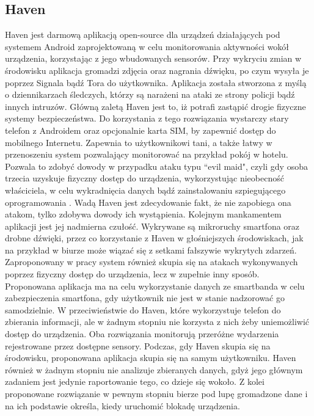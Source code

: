 \subsection{Haven}
Haven jest darmową aplikacją open-source dla urządzeń działających pod systemem Android zaprojektowaną w celu monitorowania aktywności wokół urządzenia,
korzystając z jego wbudowanych sensorów. Przy wykryciu zmian w środowisku aplikacja gromadzi zdjęcia oraz nagrania dźwięku, po czym wysyła je poprzez
Signala bądź Tora do użytkownika. Aplikacja została stworzona z myślą o dziennikarzach śledczych, którzy są narażeni na ataki ze strony policji bądź innych
intruzów\cite{Haven}.
\newline\newline
\indent Główną zaletą Haven jest to, iż potrafi zastąpić drogie fizyczne systemy bezpieczeństwa. Do korzystania z tego rozwiązania wystarczy stary telefon z Androidem oraz opcjonalnie karta SIM, by zapewnić dostęp do mobilnego Internetu. Zapewnia to użytkownikowi tani, a także łatwy w przenoszeniu system pozwalający monitorować na przykład pokój w hotelu. Pozwala to zdobyć dowody w przypadku ataku typu ``evil maid", czyli gdy osoba trzecia uzyskuje fizyczny dostęp do urządzenia, wykorzystując nieobecność właściciela, w celu wykradnięcia danych bądź zainstalowaniu szpiegującego oprogramowania \cite{Evil-Maid}.
\newline\newline
\indent Wadą Haven jest zdecydowanie fakt, że nie zapobiega ona atakom, tylko zdobywa dowody ich wystąpienia. Kolejnym mankamentem aplikacji jest jej nadmierna czułość. Wykrywane są mikroruchy smartfona oraz drobne dźwięki, przez co korzystanie z Haven w głośniejszych środowiskach, jak na przykład w biurze może wiązać się z setkami fałszywie wykrytych zdarzeń.
\newline\newline
\indent Zaproponowany w pracy system również skupia się na atakach wykonywanych poprzez fizyczny dostęp do urządzenia, lecz w zupełnie inny sposób. Proponowana aplikacja ma na celu wykorzystanie danych ze smartbanda w celu zabezpieczenia smartfona, gdy użytkownik nie jest w stanie nadzorować go samodzielnie. W
przeciwieństwie do Haven, które wykorzystuje telefon do zbierania informacji, ale w żadnym stopniu nie korzysta z nich żeby uniemożliwić dostęp do
urządzenia. Oba rozwiązania monitorują przeróżne wydarzenia rejestrowane przez dostępne sensory. Podczas, gdy Haven skupia się na środowisku,
proponowana aplikacja skupia się na samym użytkowniku. Haven również w żadnym stopniu nie analizuje zbieranych danych, gdyż jego głównym zadaniem jest
jedynie raportowanie tego, co dzieje się wokoło. Z kolei proponowane rozwiązanie w pewnym stopniu bierze pod lupę gromadzone dane i na ich podstawie
określa, kiedy uruchomić blokadę urządzenia.
